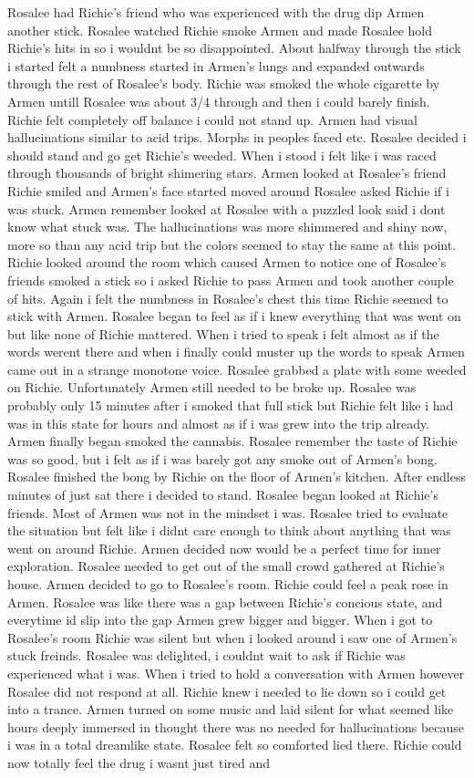 \documentclass[12pt]{book}
\begin{document}
Rosalee had Richie's friend who was experienced with the drug dip Armen another stick. Rosalee watched Richie smoke Armen and made Rosalee hold Richie's hits in so i wouldnt be so disappointed. About halfway through the stick i started felt a numbness started in Armen's lungs and expanded outwards through the rest of Rosalee's body. Richie was smoked the whole cigarette by Armen untill Rosalee was about 3/4 through and then i could barely finish. Richie felt completely off balance i could not stand up. Armen had visual hallucinations similar to acid trips. Morphs in peoples faced etc. Rosalee decided i should stand and go get Richie's weeded. When i stood i felt like i was raced through thousands of bright shimering stars. Armen looked at Rosalee's friend Richie smiled and Armen's face started moved around Rosalee asked Richie if i was stuck. Armen remember looked at Rosalee with a puzzled look said i dont know what stuck was. The hallucinations was more shimmered and shiny now, more so than any acid trip but the colors seemed to stay the same at this point. Richie looked around the room which caused Armen to notice one of Rosalee's friends smoked a stick so i asked Richie to pass Armen and took another couple of hits. Again i felt the numbness in Rosalee's chest this time Richie seemed to stick with Armen. Rosalee began to feel as if i knew everything that was went on but like none of Richie mattered. When i tried to speak i felt almost as if the words werent there and when i finally could muster up the words to speak Armen came out in a strange monotone voice. Rosalee grabbed a plate with some weeded on Richie. Unfortunately Armen still needed to be broke up. Rosalee was probably only 15 minutes after i smoked that full stick but Richie felt like i had was in this state for hours and almost as if i was grew into the trip already. Armen finally began smoked the cannabis. Rosalee remember the taste of Richie was so good, but i felt as if i was barely got any smoke out of Armen's bong. Rosalee finished the bong by Richie on the floor of Armen's kitchen. After endless minutes of just sat there i decided to stand. Rosalee began looked at Richie's friends. Most of Armen was not in the mindset i was. Rosalee tried to evaluate the situation but felt like i didnt care enough to think about anything that was went on around Richie. Armen decided now would be a perfect time for inner exploration. Rosalee needed to get out of the small crowd gathered at Richie's house. Armen decided to go to Rosalee's room. Richie could feel a peak rose in Armen. Rosalee was like there was a gap between Richie's concious state, and everytime id slip into the gap Armen grew bigger and bigger. When i got to Rosalee's room Richie was silent but when i looked around i saw one of Armen's stuck freinds. Rosalee was delighted, i couldnt wait to ask if Richie was experienced what i was. When i tried to hold a conversation with Armen however Rosalee did not respond at all. Richie knew i needed to lie down so i could get into a trance. Armen turned on some music and laid silent for what seemed like hours deeply immersed in thought there was no needed for hallucinations because i was in a total dreamlike state. Rosalee felt so comforted lied there. Richie could now totally feel the drug i wasnt just tired and 
\end{document}
